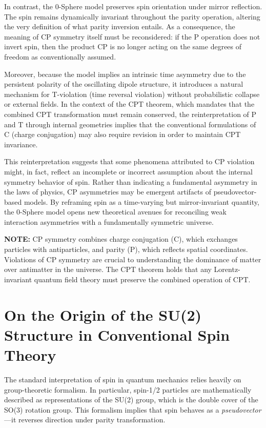 \documentclass[12pt,letterpaper]{article} %
\begin{document}
In contrast, the 0-Sphere model preserves spin orientation under mirror reflection. The spin remains dynamically invariant throughout the parity operation, altering the very definition of what parity inversion entails. As a consequence, the meaning of CP symmetry itself must be reconsidered: if the P operation does not invert spin, then the product CP is no longer acting on the same degrees of freedom as conventionally assumed. 

Moreover, because the model implies an intrinsic time asymmetry due to the persistent polarity of the oscillating dipole structure, it introduces a natural mechanism for T-violation (time reversal violation) without probabilistic collapse or external fields. In the context of the CPT theorem, which mandates that the combined CPT transformation must remain conserved, the reinterpretation of P and T through internal geometries implies that the conventional formulations of C (charge conjugation) may also require revision in order to maintain CPT invariance.

This reinterpretation suggests that some phenomena attributed to CP violation might, in fact, reflect an incomplete or incorrect assumption about the internal symmetry behavior of spin. Rather than indicating a fundamental asymmetry in the laws of physics, CP asymmetries may be emergent artifacts of pseudovector-based models. By reframing spin as a time-varying but mirror-invariant quantity, the 0-Sphere model opens new theoretical avenues for reconciling weak interaction asymmetries with a fundamentally symmetric universe.

\medskip
\noindent\textbf{NOTE:} CP symmetry combines charge conjugation (C), which exchanges particles with antiparticles, and parity (P), which reflects spatial coordinates. Violations of CP symmetry are crucial to understanding the dominance of matter over antimatter in the universe. The CPT theorem holds that any Lorentz-invariant quantum field theory must preserve the combined operation of CPT.


\section{On the Origin of the {SU(2)} Structure in Conventional Spin Theory}

The standard interpretation of spin in quantum mechanics relies heavily on group-theoretic formalism. In particular, spin-1/2 particles are mathematically described as representations of the SU(2) group, which is the double cover of the SO(3) rotation group. This formalism implies that spin behaves as a \textit{pseudovector}—it reverses direction under parity transformation.
\end{document}
